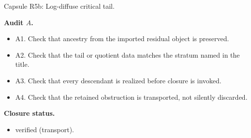 \documentclass[11pt]{amsart}
\newcommand{\capsulefield}[1]{\par\smallskip\noindent\textbf{#1.}\ }
\begin{document}
\begin{proofcapsule}{Capsule R5b: Log-diffuse critical tail.}
  \capsulefield{Audit \(A\)}
  \begin{itemize}[leftmargin=1.8em]
  \item A1. Check that ancestry from the imported residual object is preserved.
  \item A2. Check that the tail or quotient data matches the stratum named in the title.
  \item A3. Check that every descendant is realized before closure is invoked.
  \item A4. Check that the retained obstruction is transported, not silently discarded.
  \end{itemize}
  \capsulefield{Closure status}
  \begin{itemize}[leftmargin=1.8em]
  \item verified (transport).
  \end{itemize}
\end{proofcapsule}
\end{document}
